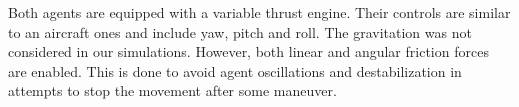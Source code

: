 
Both agents are equipped with a variable thrust engine.
Their controls are similar to an aircraft ones and include yaw, pitch and roll.
The gravitation was not considered in our simulations.
However, both linear and angular friction forces are enabled.
This is done to avoid agent oscillations and destabilization in attempts to stop the movement after some maneuver.  
